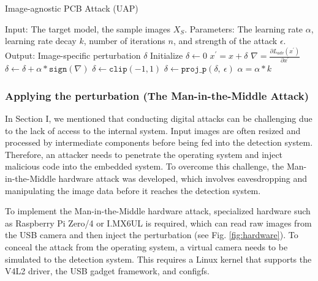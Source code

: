 \begin{algorithm}
    \caption{Image-agnostic PCB Attack (UAP)}\label{alg:image-agnostic-pcb}
    \begin{algorithmic}
        \STATE Input: The target model, the sample images $X_S$.
        \STATE Parameters: The learning rate $\alpha$, learning rate decay $k$, number of iterations $n$, and strength of the attack $\epsilon$.
        \STATE Output: Image-specific perturbation $\delta$
        \STATE Initialize $\delta \leftarrow 0$
                \STATE $x^{'} = x + \delta$  
                \STATE $\nabla = \frac{\partial L_{adv}(x^{'})}{\partial x^{'}}$
                \STATE $\delta \leftarrow \delta + \alpha * \texttt{sign}(\nabla)$ %
                \STATE $\delta \leftarrow \texttt{clip}(-1, 1)$
                \STATE $\delta \leftarrow  \texttt{proj\_p}(\delta,\ \epsilon)$ 
            \ENDFOR
        \STATE $\alpha = \alpha * k$
        \ENDFOR
    \end{algorithmic}
\end{algorithm}

\subsubsection{Applying the perturbation (The Man-in-the-Middle Attack)}

In Section I, we mentioned that conducting digital attacks can be challenging due to the lack of access to the internal system. Input images are often resized and processed by intermediate components before being fed into the detection system. Therefore, an attacker needs to penetrate the operating system and inject malicious code into the embedded system. To overcome this challenge, the Man-in-the-Middle hardware attack was developed, which involves eavesdropping and manipulating the image data before it reaches the detection system.


To implement the Man-in-the-Middle hardware attack, specialized hardware such as Raspberry Pi Zero/4 or I.MX6UL is required, which can read raw images from the USB camera and then inject the perturbation (see Fig. \ref{fig:hardware}). To conceal the attack from the operating system, a virtual camera needs to be simulated to the detection system. This requires a Linux kernel that supports the V4L2 driver, the USB gadget framework, and configfs.

